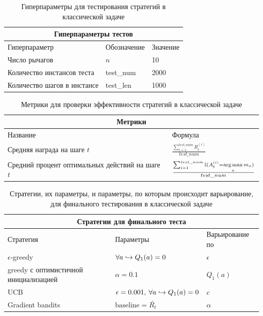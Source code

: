 \begin{table}
\centering
\renewcommand{\arraystretch}{1.3}
\begin{tabular}{ |m{4cm}|m{2.1cm}|m{2cm}|  }
 \hline
 \multicolumn{3}{|c|}{Гиперпараметры тестов} \\
 \hline
 Гиперпараметр & Обозначение & Значение \\
 \hline
  Число рычагов   &  $n$ &  10 \\
 \hline
 Количество инстансов теста & test\_num & 2000 \\
 \hline
 Количество шагов в инстансе & test\_len & 1000 \\
 \hline
\end{tabular}
\caption{Гиперпараметры для тестирования стратегий в классической задаче}
\label{table:classic_hyperparameters}
\end{table}

\begin{table}
\centering
\renewcommand{\arraystretch}{2}
\begin{tabular}{ |m{4cm}|m{5cm}|  }
 \hline
 \multicolumn{2}{|c|}{Метрики} \\
 \hline
 Название & Формула \\
 \hline
 Средняя награда на шаге $t$ & $\frac{\sum_{i=1}^{test\_num} R_t^{(i)}}{test\_num}$ \\
 \hline
 Средний процент оптимальных действий на шаге $t$ & $\frac{\sum_{i=1}^{test\_num} \mathbb{I}(A_t^{(i)} = \underset{a}{\arg \max} \, m_a)}{test\_num}$ \\
 \hline
\end{tabular}
\caption{Метрики для проверки эффективности стратегий в классической задаче}
\label{table:classic_metrics}
\end{table}

\begin{table}
\centering
\renewcommand{\arraystretch}{1.3}
\begin{tabular}{ |m{4cm}|m{4cm}|m{4cm}|  }
 \hline
 \multicolumn{3}{|c|}{Стратегии для финального теста} \\
 \hline
 Стратегия & Параметры & Варьирование по \\
 \hline
  $\epsilon$-greedy   &  $\forall a \hookrightarrow Q_1(a) = 0$ &  $\epsilon$ \\
 \hline
 greedy с оптимистичной инициализацией & $\alpha = 0.1$ & $Q_1(a)$ \\
 \hline
 UCB & $\epsilon = 0.001, \: \forall a \hookrightarrow Q_1(a) = 0$ & $c$ \\
 \hline
 Gradient bandits & $\text{baseline} = \bar{R_t}$ & $\alpha$ \\
 \hline
\end{tabular}
\caption{Стратегии, их параметры, и параметры, по которым происходит варьирование, для финального тестирования в классической задаче}
\label{table:classic_final}
\end{table}

